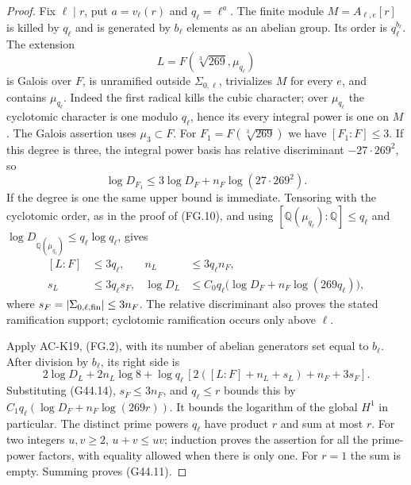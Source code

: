 \begin{proof}
Fix $\ell\mid r$, put $a=v_\ell(r)$ and $q_\ell=\ell^a$.
The finite module $M=A_{\ell,e}[r]$ is killed by $q_\ell$
and is generated by $b_\ell$ elements as an abelian group.
Its order is $q_\ell^{b_\ell}$.
The extension
\[
                 L=F(\sqrt[3]{269},\mu_{q_\ell})       \tag{G44.13}
\]
is Galois over $F$, is unramified outside
$\Sigma_{0,\ell}$, trivializes $M$ for every $e$, and
contains $\mu_{q_\ell}$.  Indeed the first radical kills
the cubic character; over $\mu_{q_\ell}$ the cyclotomic
character is one modulo $q_\ell$, hence its every integral
power is one on $M$.
The Galois assertion uses $\mu_3\subset F$.
For $F_1=F(\sqrt[3]{269})$ we have $[F_1:F]\le3$.
If this degree is three, the integral power basis has
relative discriminant $-27\cdot269^2$, so
\[
 \log D_{F_1}\le3\log D_F+n_F\log(27\cdot269^2).
\]
If the degree is one the same upper bound is immediate.
Tensoring with the cyclotomic order, as in the proof of
(FG.10), and using
$[\mathbb Q(\mu_{q_\ell}):\mathbb Q]\le q_\ell$ and
$\log D_{\mathbb Q(\mu_{q_\ell})}\le q_\ell\log q_\ell$,
gives
\[
 \begin{aligned}
 [L:F]&\le3q_\ell,&n_L&\le3q_\ell n_F,\\
 s_L&\le3q_\ell s_F,&
 \log D_L&\le C_0q_\ell
              \bigl(\log D_F+n_F\log(269q_\ell)\bigr),
 \end{aligned}                                                 \tag{G44.14}
\]
where $s_F=|\Sigma_{0,\ell,\rm fin}|\le3n_F$.
The relative discriminant also proves the stated
ramification support; cyclotomic ramification occurs
only above $\ell$.

Apply AC-K19, (FG.2), with its number of abelian generators
set equal to $b_\ell$.  After division by $b_\ell$, its
right side is
\[
 2\log D_L+2n_L\log8+
 \log q_\ell\,[2([L:F]+n_L+s_L)+n_F+3s_F].
\]
Substituting (G44.14), $s_F\le3n_F$, and
$q_\ell\le r$ bounds this by
$C_1q_\ell(\log D_F+n_F\log(269r))$.
It bounds the logarithm of the global $H^1$ in particular.
The distinct prime powers $q_\ell$ have product $r$ and
sum at most $r$.  For two integers $u,v\ge2$,
$u+v\le uv$; induction proves the assertion for all the
prime-power factors, with equality allowed when there
is only one.  For $r=1$ the sum is empty.
Summing proves (G44.11).


\end{proof}
